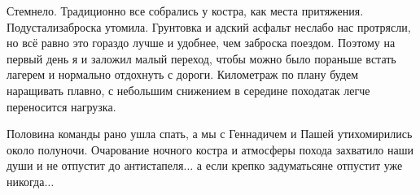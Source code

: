 Стемнело. Традиционно все собрались у костра, как места притяжения. Подустали\mdash заброска утомила. Грунтовка и адский асфальт неслабо нас протрясли, но всё равно это гораздо лучше и удобнее, чем заброска поездом. Поэтому на первый день я и заложил малый переход, чтобы можно было пораньше встать лагерем и нормально отдохнуть с дороги. Километраж по плану будем наращивать плавно, с небольшим снижением в середине похода\mdash так легче переносится нагрузка.

Половина команды рано ушла спать, а мы с Геннадичем и Пашей утихомирились около полуночи. Очарование ночного костра и атмосферы похода захватило наши души и не отпустит до антистапеля$\ldots$ а если крепко задуматься\mdash не отпустит уже никогда$\ldots$

\begin{center}
\end{center}
